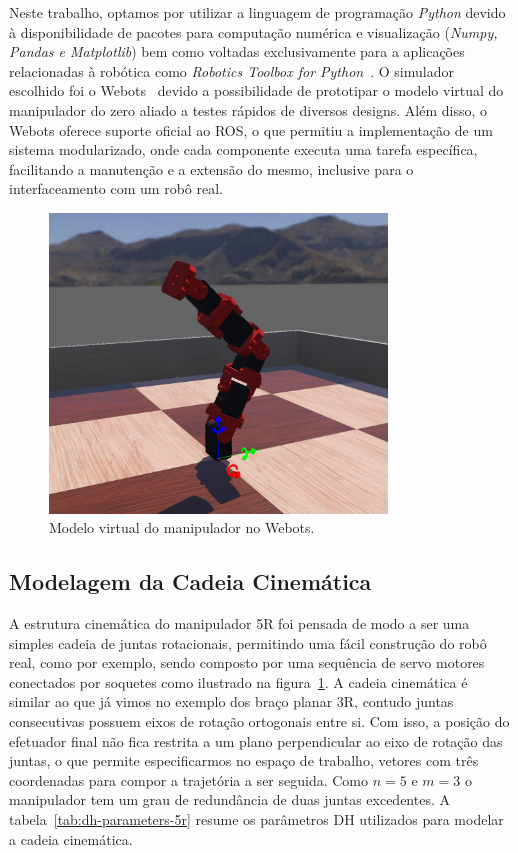 Neste trabalho, optamos por utilizar a linguagem de programação \emph{Python}
devido à disponibilidade de pacotes para computação numérica e visualização
(\emph{Numpy, Pandas e Matplotlib}) bem como voltadas exclusivamente para a
aplicações relacionadas à robótica como \emph{Robotics Toolbox for
    Python}~\cite{rtb}. O simulador escolhido foi o Webots~\cite{webots} devido a
possibilidade de prototipar o modelo virtual do manipulador do zero aliado a
testes rápidos de diversos designs. Além disso, o Webots oferece suporte
oficial ao ROS, o que permitiu a implementação de um sistema modularizado, onde
cada componente executa uma tarefa específica, facilitando a manutenção e a
extensão do mesmo, inclusive para o interfaceamento com um robô real.

\begin{figure}
    \centering
    \includegraphics[width=0.8\textwidth]{./Images/webots-robot.png}
    \caption{Modelo virtual do manipulador no Webots.}\label{fig:robot-model}
\end{figure}

\subsection*{Modelagem da Cadeia Cinemática}

A estrutura cinemática do manipulador 5R foi pensada de modo a ser uma simples
cadeia de juntas rotacionais, permitindo uma fácil construção do robô real,
como por exemplo, sendo composto por uma sequência de servo motores conectados
por soquetes como ilustrado na figura~\ref{fig:robot-model}. A cadeia
cinemática é similar ao que já vimos no exemplo dos braço planar 3R, contudo
juntas consecutivas possuem eixos de rotação ortogonais entre si. Com isso, a
posição do efetuador final não fica restrita a um plano perpendicular ao eixo
de rotação das juntas, o que permite especificarmos no espaço de trabalho,
vetores com três coordenadas para compor a trajetória a ser seguida. Como \(n =
5 \text{ e } m = 3\) o manipulador tem um grau de redundância de duas juntas
excedentes. A tabela~\ref{tab:dh-parameters-5r} resume os parâmetros DH
utilizados para modelar a cadeia cinemática.

